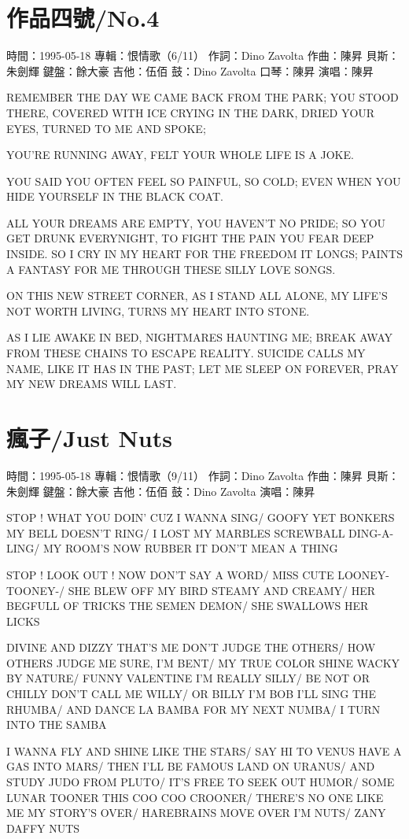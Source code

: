 \documentclass[UTF8,a4paper,oneside,twocolumn,12pt]{ctexbook}
\newcommand{\infopair}[2]{\textbullet #1：#2}
\newcommand{\zc}[1][伍佰]{\infopair{作詞}{#1}}
\newcommand{\zq}[1][伍佰]{\infopair{作曲}{#1}}
\newcommand{\zj}[1]{\infopair{專輯}{#1}}
\newcommand{\sj}[1]{\infopair{時間}{#1}}
\newenvironment{info}{\begin{flushleft}\kaishu
	}
	{\end{flushleft}\normalsize\yahei\par}
\newenvironment{lyric}{
	}
{}
\begin{document}
\section{作品四號/No.4}
\begin{info}
	\sj{1995-05-18}
	\zj{恨情歌（6/11）}
	\zc[Dino Zavolta]
	\zq[陳昇]
	\infopair{貝斯}{朱劍輝}
	\infopair{鍵盤}{餘大豪}
	\infopair{吉他}{伍佰}
	\infopair{鼓}{Dino Zavolta}
	\infopair{口琴}{陳昇}
	\infopair{演唱}{陳昇}
\end{info}
\begin{lyric}
	REMEMBER THE DAY
	WE CAME BACK FROM THE PARK;
	YOU STOOD THERE, COVERED WITH ICE
	CRYING IN THE DARK,
	DRIED YOUR EYES,
	TURNED TO ME AND SPOKE;

	YOU'RE RUNNING AWAY,
	FELT YOUR WHOLE LIFE IS A JOKE.

	YOU SAID YOU OFTEN
	FEEL SO PAINFUL, SO COLD;
	EVEN WHEN YOU HIDE YOURSELF
	IN THE BLACK COAT.

	ALL YOUR DREAMS ARE EMPTY,
	YOU HAVEN'T NO PRIDE;
	SO YOU GET DRUNK EVERYNIGHT,
	TO FIGHT THE PAIN YOU FEAR DEEP INSIDE.
	SO I CRY IN MY HEART
	FOR THE FREEDOM IT LONGS;
	PAINTS A FANTASY FOR ME
	THROUGH THESE SILLY LOVE SONGS.

	ON THIS NEW STREET CORNER,
	AS I STAND ALL ALONE,
	MY LIFE'S NOT WORTH LIVING,
	TURNS MY HEART INTO STONE.

	AS I LIE AWAKE IN BED,
	NIGHTMARES HAUNTING ME;
	BREAK AWAY FROM THESE CHAINS
	TO ESCAPE REALITY.
	SUICIDE CALLS MY NAME,
	LIKE IT HAS IN THE PAST;
	LET ME SLEEP ON FOREVER,
	PRAY MY NEW DREAMS WILL LAST.
\end{lyric}

\section{瘋子/Just Nuts}
\begin{info}
	\sj{1995-05-18}
	\zj{恨情歌（9/11）}
	\zc[Dino Zavolta]
	\zq[陳昇]
	\infopair{貝斯}{朱劍輝}
	\infopair{鍵盤}{餘大豪}
	\infopair{吉他}{伍佰}
	\infopair{鼓}{Dino Zavolta}
	\infopair{演唱}{陳昇}
\end{info}
\begin{lyric}
	STOP ! WHAT YOU DOIN' CUZ I WANNA SING/
	GOOFY YET BONKERS MY BELL DOESN'T RING/
	I LOST MY MARBLES SCREWBALL DING-A-LING/
	MY ROOM'S NOW RUBBER IT DON'T MEAN A THING

	STOP ! LOOK OUT ! NOW DON'T SAY A WORD/
	MISS CUTE LOONEY-TOONEY-/
	SHE BLEW OFF MY BIRD STEAMY AND CREAMY/
	HER BEGFULL OF TRICKS THE SEMEN DEMON/
	SHE SWALLOWS HER LICKS

	DIVINE AND DIZZY THAT'S ME DON'T JUDGE THE OTHERS/
	HOW OTHERS JUDGE ME SURE, I'M BENT/
	MY TRUE COLOR SHINE WACKY BY NATURE/
	FUNNY VALENTINE I'M REALLY SILLY/
	BE NOT OR CHILLY DON'T CALL ME WILLY/
	OR BILLY I'M BOB I'LL SING THE RHUMBA/
	AND DANCE LA BAMBA FOR MY NEXT NUMBA/
	I TURN INTO THE SAMBA

	I WANNA FLY AND SHINE LIKE THE STARS/
	SAY HI TO VENUS HAVE A GAS INTO MARS/
	THEN I'LL BE FAMOUS LAND ON URANUS/
	AND STUDY JUDO FROM PLUTO/
	IT'S FREE TO SEEK OUT HUMOR/
	SOME LUNAR TOONER THIS COO COO CROONER/
	THERE'S NO ONE LIKE ME MY STORY'S OVER/
	HAREBRAINS MOVE OVER I'M NUTS/
	ZANY DAFFY NUTS
\end{lyric}
\end{document}

